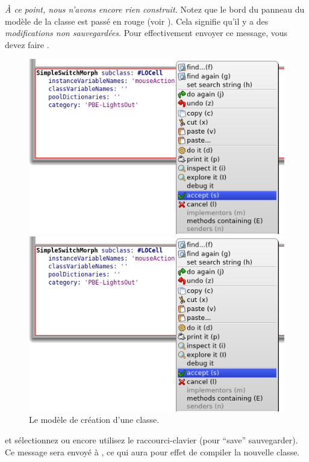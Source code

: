 \documentclass[a4paper,10pt,twoside]{book}
\begin{document}
\emph{À ce point, nous n'avons encore rien construit.}
Notez que le bord du panneau du modèle de la classe est passé en rouge
(voir ).
Cela signifie qu'il y a des \emph{modifications non sauvegardées}.
Pour effectivement envoyer ce message, vous devez faire .

\begin{figure}[h!t]
\ifluluelse
	{\centerline {\includegraphics[width=\textwidth]{AcceptClassDef}}}
	{\centerline {\includegraphics[scale=0.7]{AcceptClassDef}}}
\caption{Le modèle de création d'une classe.
}
\end{figure}

\Actclickz{} et sélectionnez  ou encore utilisez le
raccourci-clavier  (pour ``save'' 
\cad sauvegarder).
Ce message sera envoyé à , ce qui aura pour
effet de compiler la nouvelle classe.
\end{document}
